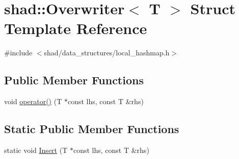 \hypertarget{structshad_1_1Overwriter}{\section{shad\-:\-:Overwriter$<$ T $>$ Struct Template Reference}
\label{structshad_1_1Overwriter}
}


{\ttfamily \#include $<$shad/data\-\_\-structures/local\-\_\-hashmap.\-h$>$}

\subsection*{Public Member Functions}
\begin{DoxyCompactItemize}
\item 
void \hyperlink{structshad_1_1Overwriter_abe35de940744abbf1061aed8c0768bff}{operator()} (T $\ast$const lhs, const T \&rhs)
\end{DoxyCompactItemize}
\subsection*{Static Public Member Functions}
\begin{DoxyCompactItemize}
\item 
static void \hyperlink{structshad_1_1Overwriter_ab33b577d95cc481cc5830676aa5756d3}{Insert} (T $\ast$const lhs, const T \&rhs)
\end{DoxyCompactItemize}


